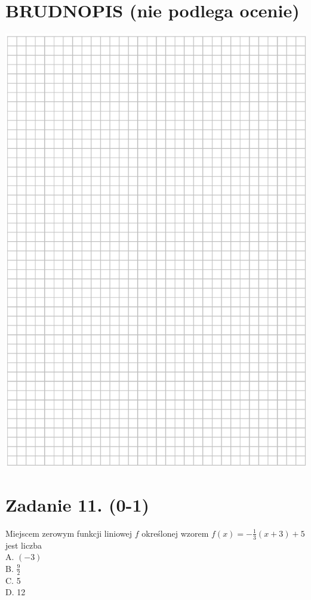 \documentclass[10pt]{article}
\begin{document}
\section*{BRUDNOPIS (nie podlega ocenie)}
\begin{center}
\includegraphics[max width=\textwidth]{2024_11_21_465acd0c12fa3e05e8a7g-07}
\end{center}

\section*{Zadanie 11. (0-1)}
Miejscem zerowym funkcji liniowej \(f\) określonej wzorem \(f(x)=-\frac{1}{3}(x+3)+5\) jest liczba\\
A. \((-3)\)\\
B. \(\frac{9}{2}\)\\
C. 5\\
D. 12
\end{document}
